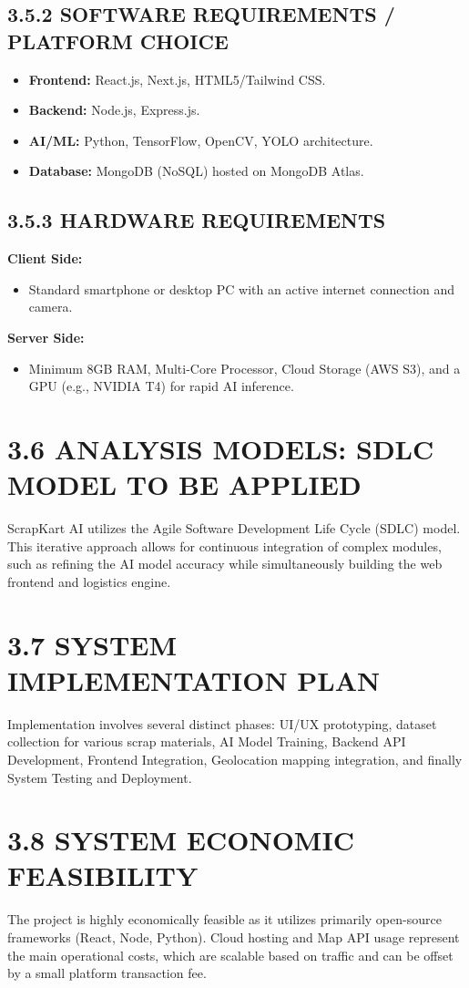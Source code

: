 \subsection{3.5.2 SOFTWARE REQUIREMENTS / PLATFORM CHOICE}
\begin{itemize}
    \item \textbf{Frontend:} React.js, Next.js, HTML5/Tailwind CSS.
    \item \textbf{Backend:} Node.js, Express.js.
    \item \textbf{AI/ML:} Python, TensorFlow, OpenCV, YOLO architecture.
    \item \textbf{Database:} MongoDB (NoSQL) hosted on MongoDB Atlas.
\end{itemize}

\subsection{3.5.3 HARDWARE REQUIREMENTS}
\textbf{Client Side:}
\begin{itemize}
    \item Standard smartphone or desktop PC with an active internet connection and camera.
\end{itemize}

\textbf{Server Side:}
\begin{itemize}
    \item Minimum 8GB RAM, Multi-Core Processor, Cloud Storage (AWS S3), and a GPU (e.g., NVIDIA T4) for rapid AI inference.
\end{itemize}

\section{3.6 ANALYSIS MODELS: SDLC MODEL TO BE APPLIED}
ScrapKart AI utilizes the Agile Software Development Life Cycle (SDLC) model. This iterative approach allows for continuous integration of complex modules, such as refining the AI model accuracy while simultaneously building the web frontend and logistics engine.

\section{3.7 SYSTEM IMPLEMENTATION PLAN}
Implementation involves several distinct phases: UI/UX prototyping, dataset collection for various scrap materials, AI Model Training, Backend API Development, Frontend Integration, Geolocation mapping integration, and finally System Testing and Deployment.

\section{3.8 SYSTEM ECONOMIC FEASIBILITY}
The project is highly economically feasible as it utilizes primarily open-source frameworks (React, Node, Python). Cloud hosting and Map API usage represent the main operational costs, which are scalable based on traffic and can be offset by a small platform transaction fee.
